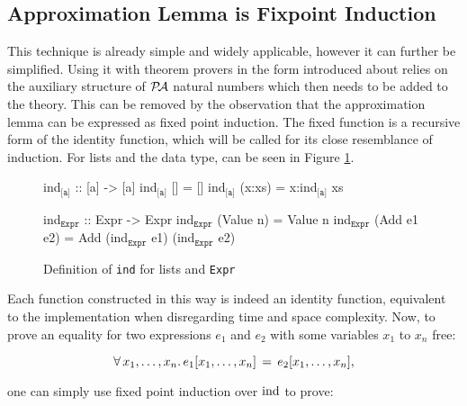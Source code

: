 \subsection{Approximation Lemma is Fixpoint Induction}

This technique is already simple and widely applicable, however it can
further be simplified. Using it with theorem provers in the form
introduced about relies on the auxiliary structure of $\mathcal{P\!A}$ natural
numbers which then needs to be added to the theory. This can be
removed by the observation that the approximation lemma can be
expressed as fixed point induction. The fixed function is a recursive
form of the identity function, which will be called  for its
close resemblance of induction. For lists and the  data type,
 can be seen in Figure \ref{code:ind}.

\begin{figure}[h!]
\centering
\begin{minipage}[b]{5cm}
\begin{code}[mathescape]
ind$_{\texttt{[a]}}$ :: [a] -> [a]
ind$_{\texttt{[a]}}$ [] = []
ind$_{\texttt{[a]}}$ (x:xs) = x:ind$_{\texttt{[a]}}$ xs
\end{code}
\end{minipage}
\hspace{10pt}
\begin{minipage}[b]{8.3cm}
\begin{code}[mathescape]
ind$_{\texttt{Expr}}$ :: Expr -> Expr
ind$_{\texttt{Expr}}$ (Value n) = Value n
ind$_{\texttt{Expr}}$ (Add e1 e2) = Add (ind$_{\texttt{Expr}}$ e1) (ind$_{\texttt{Expr}}$ e2)
\end{code}
\label{code:approx}
\end{minipage}
\caption{Definition of \texttt{ind} for lists and \texttt{Expr}
\label{code:ind}
}
\end{figure}

Each  function constructed in this way is indeed an identity
function, equivalent to the implementation  when
disregarding time and space complexity.
Now, to prove an equality for two expressions $e_1$ and $e_2$ with
some variables $x_1$ to $x_n$ free:

\begin{equation*}
\forall \, x_1, \ldots, x_n . \, e_1[x_1, \ldots, x_n] \, = \, e_2[x_1, \ldots, x_n],
\end{equation*}

\noindent
one can simply use fixed point induction over $\mathrm{ind}$ to prove:

